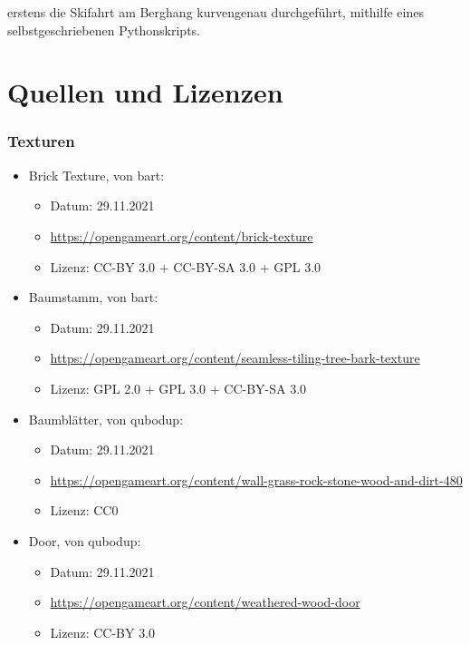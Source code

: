 \documentclass{article}
\begin{document}
erstens die Skifahrt am Berghang kurvengenau
durchgeführt, mithilfe eines selbstgeschriebenen Pythonskripts.





\newpage 

\section*{Quellen und Lizenzen}
\subsubsection*{Texturen}
\begin{itemize}
    \item Brick Texture, von bart:
        \begin{itemize}
            \item Datum: 29.11.2021
            \item \url{https://opengameart.org/content/brick-texture}
            \item Lizenz: CC-BY 3.0 + CC-BY-SA 3.0 + GPL 3.0
        \end{itemize}
    \item Baumstamm, von bart:
        \begin{itemize}
            \item Datum: 29.11.2021
            \item \url{https://opengameart.org/content/seamless-tiling-tree-bark-texture}
            \item Lizenz: GPL 2.0 + GPL 3.0 + CC-BY-SA 3.0
        \end{itemize}
    \item Baumblätter, von qubodup:
        \begin{itemize}
            \item Datum: 29.11.2021
            \item \url{https://opengameart.org/content/wall-grass-rock-stone-wood-and-dirt-480}
            \item Lizenz: CC0
        \end{itemize}
    \item Door, von qubodup:
        \begin{itemize}
            \item Datum: 29.11.2021
            \item \url{https://opengameart.org/content/weathered-wood-door}
            \item Lizenz: CC-BY 3.0
        \end{itemize}
\end{itemize}
\end{document}
